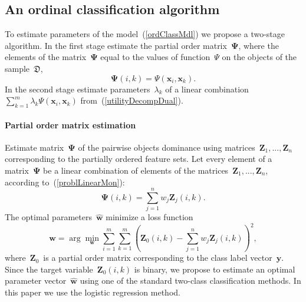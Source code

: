\documentclass[12pt,preprint]{elsarticle}
\newcommand{\bx}{\mathbf{x}}
\newcommand{\by}{\mathbf{y}}
\newcommand{\bw}{\mathbf{w}}
\newcommand{\bZ}{\mathbf{Z}}
\newcommand{\bPsi}{\boldsymbol{\Psi}}
\begin{document}
\subsection{An ordinal classification algorithm}
To estimate parameters of the model~(\ref{ordClassMdl}) we propose a two-stage algorithm. In the first stage estimate the partial order matrix~$\bPsi$, where the elements of the matrix~$\bPsi$ equal to the values of function~$\Psi$ on the objects of the sample~$\mathfrak{D}$,
\[
\bPsi(i,k) = \Psi(\bx_i,\bx_k).
\]
In the second stage estimate parameters~$\lambda_k$ of a linear combination~$\sum\limits_{k=1}^m \lambda_{k} \Psi(\bx_i, \bx_k)$ from~(\ref{utilityDecompDual}).
\paragraph{Partial order matrix estimation}
Estimate matrix~$\bPsi$ of the pairwise objects dominance using matrices~$\bZ_1,...,\bZ_n$ corresponding to the partially ordered feature sets. Let every element of a matrix~$\bPsi$ be a linear combination of elements of the matrices~$\bZ_1,...,\bZ_n$, according to~(\ref{problLinearMon}):
\[
\bPsi(i,k)=\sum\limits_{j=1}^n w_j\bZ_j(i,k).
\]
The optimal parameters~$\hat{\bw}$ minimize a loss function
\[
\hat{\bw} = \arg\min\limits_{\bw}\sum\limits_{i=1}^m\sum\limits_{k=1}^m\left(\bZ_0(i,k) - \sum\limits_{j=1}^n w_j\bZ_j(i,k)\right)^2,
\]
where~$\bZ_0$~is a partial order matrix corresponding to the class label vector~$\by$.
Since the target variable~$\bZ_0(i,k)$ is binary, we propose to estimate an optimal parameter vector~$\hat{\bw}$ using one of the standard two-class classification methods. In this paper we use the logistic regression method.
\end{document}
